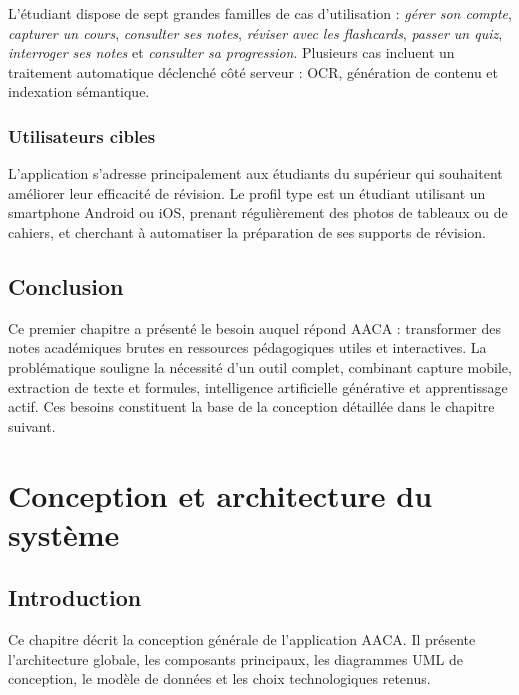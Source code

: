 \documentclass[12pt,a4paper]{report}
\begin{document}
L'étudiant dispose de sept grandes familles de cas d'utilisation : \textit{gérer son compte}, \textit{capturer un cours}, \textit{consulter ses notes}, \textit{réviser avec les flashcards}, \textit{passer un quiz}, \textit{interroger ses notes} et \textit{consulter sa progression}. Plusieurs cas incluent un traitement automatique déclenché côté serveur : OCR, génération de contenu et indexation sémantique.

\subsection{Utilisateurs cibles}

L'application s'adresse principalement aux étudiants du supérieur qui souhaitent améliorer leur efficacité de révision. Le profil type est un étudiant utilisant un smartphone Android ou iOS, prenant régulièrement des photos de tableaux ou de cahiers, et cherchant à automatiser la préparation de ses supports de révision.

\section{Conclusion}

Ce premier chapitre a présenté le besoin auquel répond AACA : transformer des notes académiques brutes en ressources pédagogiques utiles et interactives. La problématique souligne la nécessité d'un outil complet, combinant capture mobile, extraction de texte et formules, intelligence artificielle générative et apprentissage actif. Ces besoins constituent la base de la conception détaillée dans le chapitre suivant.

\chapter{Conception et architecture du système}

\section{Introduction}

Ce chapitre décrit la conception générale de l'application AACA. Il présente l'architecture globale, les composants principaux, les diagrammes UML de conception, le modèle de données et les choix technologiques retenus.
\end{document}
